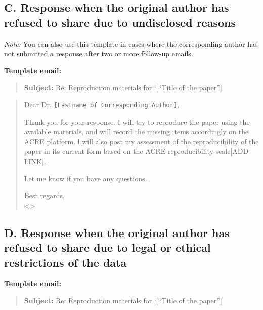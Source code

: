 \documentclass[]{book}
\begin{document}
\hypertarget{c.-response-when-the-original-author-has-refused-to-share-due-to-undisclosed-reasons}{%
\subsection{C. Response when the original author has refused to share due to undisclosed reasons}\label{c.-response-when-the-original-author-has-refused-to-share-due-to-undisclosed-reasons}}

\emph{Note:} You can also use this template in cases where the corresponding author has not submitted a response after two or more follow-up emails.

\textbf{Template email:}

\begin{quote}
\textbf{Subject:} Re: Reproduction materials for `{[}``Title of the paper''{]}
\end{quote}

\begin{quote}
Dear Dr. \texttt{{[}Lastname\ of\ Corresponding\ Author{]}},

Thank you for your response. I will try to reproduce the paper using the available materials, and will record the missing items accordingly on the ACRE platform. l will also post my assessment of the reproducibility of the paper in its current form based on the ACRE reproducibility scale{[}ADD LINK{]}.

Let me know if you have any questions.

Best regards,\\
\textless{}\textgreater{}
\end{quote}

\hypertarget{d.-response-when-the-original-author-has-refused-to-share-due-to-legal-or-ethical-restrictions-of-the-data}{%
\subsection{D. Response when the original author has refused to share due to legal or ethical restrictions of the data}\label{d.-response-when-the-original-author-has-refused-to-share-due-to-legal-or-ethical-restrictions-of-the-data}}

\textbf{Template email:}

\begin{quote}
\textbf{Subject:} Re: Reproduction materials for `{[}``Title of the paper''{]}
\end{quote}
\end{document}
